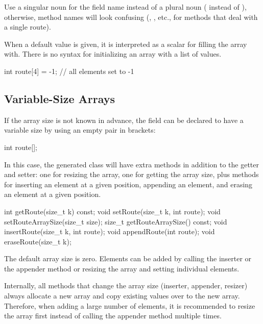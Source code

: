 \begin{note}
  Use a singular noun for the field name instead of a plural noun (
  instead of ), otherwise, method names will look confusing
  (, , etc., for methods that deal with a
  single route).
\end{note}

When a default value is given, it is interpreted as a scalar for filling the
array with. There is no syntax for initializing an array with a list of values.

\begin{msg}
int route[4] = -1; // all elements set to -1
\end{msg}


\subsection{Variable-Size Arrays}
\label{sec:msg-defs:variable-size-arrays}

If the array size is not known in advance, the field can be declared to have a
variable size by using an empty pair in brackets:

\begin{msg}
int route[];
\end{msg}

In this case, the generated class will have extra methods in addition to the
getter and setter: one for resizing the array, one for getting the array size,
plus methods for inserting an element at a given position, appending an element,
and erasing an element at a given position.

\begin{cpp}
int getRoute(size_t k) const;
void setRoute(size_t k, int route);
void setRouteArraySize(size_t size);
size_t getRouteArraySize() const;
void insertRoute(size_t k, int route);
void appendRoute(int route);
void eraseRoute(size_t k);
\end{cpp}

The default array size is zero. Elements can be added by calling the inserter or
the appender method or resizing the array and setting individual elements.

Internally, all methods that change the array size (inserter, appender, resizer)
always allocate a new array and copy existing values over to the new array.
Therefore, when adding a large number of elements, it is recommended to resize
the array first instead of calling the appender method multiple times.

